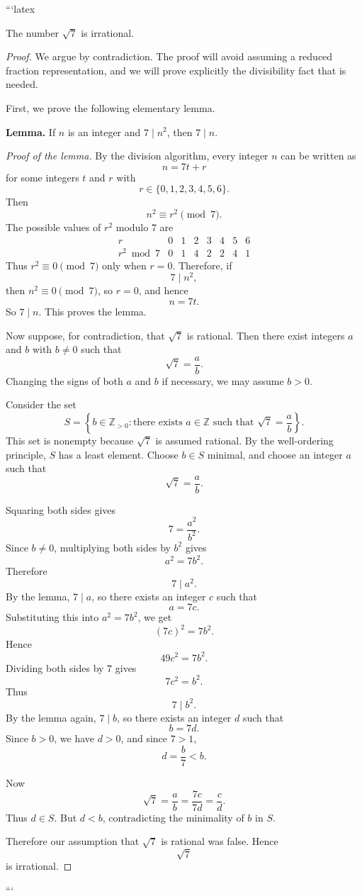 ```latex
\begin{theorem}
The number $\sqrt{7}$ is irrational.
\end{theorem}

\begin{proof}
We argue by contradiction. The proof will avoid assuming a reduced fraction
representation, and we will prove explicitly the divisibility fact that is needed.

First, we prove the following elementary lemma.

\medskip

\noindent\textbf{Lemma.} If $n$ is an integer and $7 \mid n^2$, then $7 \mid n$.

\smallskip

\noindent\textit{Proof of the lemma.}
By the division algorithm, every integer $n$ can be written as
\[
n=7t+r
\]
for some integers $t$ and $r$ with
\[
r \in \{0,1,2,3,4,5,6\}.
\]
Then
\[
n^2 \equiv r^2 \pmod 7.
\]
The possible values of $r^2$ modulo $7$ are
\[
\begin{array}{c|ccccccc}
r & 0 & 1 & 2 & 3 & 4 & 5 & 6 \\ \hline
r^2 \bmod 7 & 0 & 1 & 4 & 2 & 2 & 4 & 1
\end{array}
\]
Thus $r^2 \equiv 0 \pmod 7$ only when $r=0$. Therefore, if
\[
7 \mid n^2,
\]
then $n^2 \equiv 0 \pmod 7$, so $r=0$, and hence
\[
n=7t.
\]
So $7 \mid n$. This proves the lemma.

\medskip

Now suppose, for contradiction, that $\sqrt{7}$ is rational. Then there exist integers
$a$ and $b$ with $b \neq 0$ such that
\[
\sqrt{7}=\frac{a}{b}.
\]
Changing the signs of both $a$ and $b$ if necessary, we may assume $b>0$.

Consider the set
\[
S=\left\{ b \in \mathbb{Z}_{>0} : \text{there exists } a \in \mathbb{Z}
\text{ such that } \sqrt{7}=\frac{a}{b} \right\}.
\]
This set is nonempty because $\sqrt{7}$ is assumed rational. By the well-ordering
principle, $S$ has a least element. Choose $b \in S$ minimal, and choose an integer
$a$ such that
\[
\sqrt{7}=\frac{a}{b}.
\]

Squaring both sides gives
\[
7=\frac{a^2}{b^2}.
\]
Since $b \neq 0$, multiplying both sides by $b^2$ gives
\[
a^2=7b^2.
\]
Therefore
\[
7 \mid a^2.
\]
By the lemma, $7 \mid a$, so there exists an integer $c$ such that
\[
a=7c.
\]
Substituting this into $a^2=7b^2$, we get
\[
(7c)^2=7b^2.
\]
Hence
\[
49c^2=7b^2.
\]
Dividing both sides by $7$ gives
\[
7c^2=b^2.
\]
Thus
\[
7 \mid b^2.
\]
By the lemma again, $7 \mid b$, so there exists an integer $d$ such that
\[
b=7d.
\]
Since $b>0$, we have $d>0$, and since $7>1$,
\[
d=\frac{b}{7}<b.
\]

Now
\[
\sqrt{7}=\frac{a}{b}=\frac{7c}{7d}=\frac{c}{d}.
\]
Thus $d \in S$. But $d<b$, contradicting the minimality of $b$ in $S$.

Therefore our assumption that $\sqrt{7}$ is rational was false. Hence
\[
\sqrt{7}
\]
is irrational.
\end{proof}
```